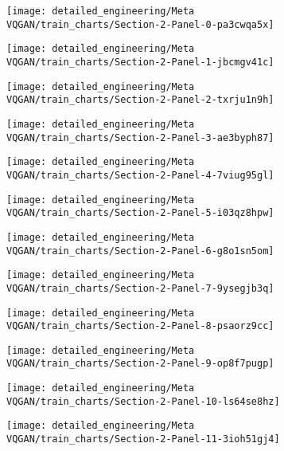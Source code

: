 
\begin{figure}[H]
\texttt{[image: detailed\_engineering/Meta VQGAN/train\_charts/Section-2-Panel-0-pa3cwqa5x]}
\caption{}
\endminipage\hfill
{}
\texttt{[image: detailed\_engineering/Meta VQGAN/train\_charts/Section-2-Panel-1-jbcmgv41c]}
\caption{}
\endminipage
\end{figure}

\begin{figure}[H]
\texttt{[image: detailed\_engineering/Meta VQGAN/train\_charts/Section-2-Panel-2-txrju1n9h]}
\caption{}
\endminipage\hfill
{}
\texttt{[image: detailed\_engineering/Meta VQGAN/train\_charts/Section-2-Panel-3-ae3byph87]}
\caption{}
\endminipage
\end{figure}

\begin{figure}[H]
\texttt{[image: detailed\_engineering/Meta VQGAN/train\_charts/Section-2-Panel-4-7viug95gl]}
\caption{}
\endminipage\hfill
{}
\texttt{[image: detailed\_engineering/Meta VQGAN/train\_charts/Section-2-Panel-5-i03qz8hpw]}
\caption{}
\endminipage
\end{figure}

\begin{figure}[H]
\texttt{[image: detailed\_engineering/Meta VQGAN/train\_charts/Section-2-Panel-6-g8o1sn5om]}
\caption{}
\endminipage\hfill
{}
\texttt{[image: detailed\_engineering/Meta VQGAN/train\_charts/Section-2-Panel-7-9ysegjb3q]}
\caption{}
\endminipage
\end{figure}

\begin{figure}[H]
\texttt{[image: detailed\_engineering/Meta VQGAN/train\_charts/Section-2-Panel-8-psaorz9cc]}
\caption{}
\endminipage\hfill
{}
\texttt{[image: detailed\_engineering/Meta VQGAN/train\_charts/Section-2-Panel-9-op8f7pugp]}
\caption{}
\endminipage
\end{figure}

\begin{figure}[H]
\texttt{[image: detailed\_engineering/Meta VQGAN/train\_charts/Section-2-Panel-10-ls64se8hz]}
\caption{}
\endminipage\hfill
{}
\texttt{[image: detailed\_engineering/Meta VQGAN/train\_charts/Section-2-Panel-11-3ioh51gj4]}
\caption{}
\endminipage
\end{figure}

